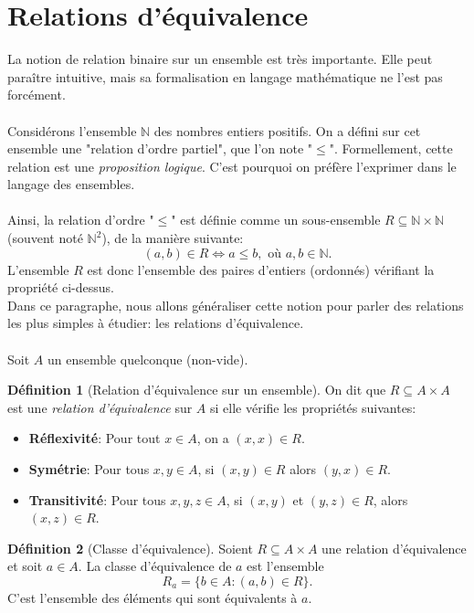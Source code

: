 \documentclass[oneside,12pt,french,table]{book}
\newcommand{\N}{\mathbb{N}}
\theoremstyle{definition}
\theoremstyle{definition}
\theoremstyle{definition}
\newtheorem{definition}{Définition}[chapter]
\begin{document}
\section{Relations d'équivalence}
La notion de relation binaire sur un ensemble est très importante. Elle peut paraître intuitive, mais sa formalisation en langage mathématique ne l'est pas forcément. \\ \\
Considérons l'ensemble $\N$ des nombres entiers positifs. On a défini sur cet ensemble une "relation d'ordre partiel", que l'on note "$\leq$". Formellement, cette relation est une \textit{proposition logique}. C'est pourquoi on préfère l'exprimer dans le langage des ensembles. \\ \\
Ainsi, la relation d'ordre "$\leq$" est définie comme un sous-ensemble $R \subseteq \N \times \N$ (souvent noté $\N^2$), de la manière suivante:
$$(a,b) \in R \iff a \leq b, \text{ où } a,b \in \N.$$
L'ensemble $R$ est donc l'ensemble des paires d'entiers (ordonnés) vérifiant la propriété ci-dessus. \\
Dans ce paragraphe, nous allons généraliser cette notion pour parler des relations les plus simples à étudier: les relations d'équivalence. \\ \\
Soit $A$ un ensemble quelconque (non-vide).
\begin{definition}[Relation d'équivalence sur un ensemble]
On dit que $R \subseteq A\times A$ est une \textit{relation d'équivalence} sur $A$ si elle vérifie les propriétés suivantes:
\begin{itemize}
\item \textbf{Réflexivité}: Pour tout $x \in A$, on a $(x,x) \in R$.
\item \textbf{Symétrie}: Pour tous $x,y\in A$, si $(x,y)\in R$ alors $(y,x) \in R$.
\item \textbf{Transitivité}: Pour tous $x,y,z \in A$, si $(x,y)$ et $(y,z)\in R$, alors $(x,z)\in R.$
\end{itemize}
\end{definition}

\begin{definition}[Classe d'équivalence]
Soient $R \subseteq A\times A$ une relation d'équivalence et soit $a \in A$. La classe d'équivalence de $a$ est l'ensemble 
\[
	R_a=\{b \in A: (a,b)\in R\}.
\]
C'est l'ensemble des éléments qui sont équivalents à $a$.
\end{definition}
\end{document}
